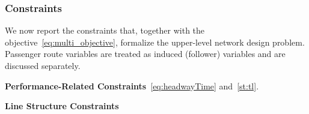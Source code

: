\documentclass[a4paper,fleqn]{cas-sc}
\begin{document}


\subsubsection{Constraints}
We now report the constraints that, together with the objective~\eqref{eq:multi_objective},
formalize the upper-level network design problem. Passenger route variables are treated as induced (follower) variables and are discussed separately.

\textbf{Performance-Related Constraints}~\eqref{eq:headwayTime} and~\eqref{st:tl}.

\textbf{Line Structure Constraints}
\end{document}
